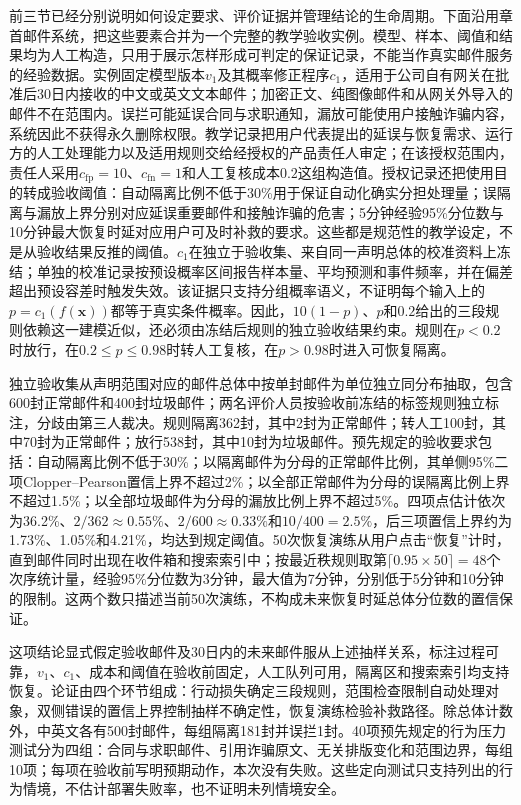 前三节已经分别说明如何设定要求、评价证据并管理结论的生命周期。下面沿用章首邮件系统，把这些要素合并为一个完整的教学验收实例。模型、样本、阈值和结果均为人工构造，只用于展示怎样形成可判定的保证记录，不能当作真实邮件服务的经验数据。实例固定模型版本$v_1$及其概率修正程序$c_1$，适用于公司自有网关在批准后30日内接收的中文或英文文本邮件；加密正文、纯图像邮件和从网关外导入的邮件不在范围内。误拦可能延误合同与求职通知，漏放可能使用户接触诈骗内容，系统因此不获得永久删除权限。教学记录把用户代表提出的延误与恢复需求、运行方的人工处理能力以及适用规则交给经授权的产品责任人审定；在该授权范围内，责任人采用$c_{\mathrm{fp}}=10$、$c_{\mathrm{fn}}=1$和人工复核成本$0.2$这组构造值。授权记录还把使用目的转成验收阈值：自动隔离比例不低于30\%用于保证自动化确实分担处理量；误隔离与漏放上界分别对应延误重要邮件和接触诈骗的危害；5分钟经验95\%分位数与10分钟最大恢复时延对应用户可及时补救的要求。这些都是规范性的教学设定，不是从验收结果反推的阈值。$c_1$在独立于验收集、来自同一声明总体的校准资料上冻结；单独的校准记录按预设概率区间报告样本量、平均预测和事件频率，并在偏差超出预设容差时触发失效。该证据只支持分组概率语义，不证明每个输入上的$p=c_1(f(\bm x))$都等于真实条件概率。因此，$10(1-p)$、$p$和$0.2$给出的三段规则依赖这一建模近似，还必须由冻结后规则的独立验收结果约束。规则在$p<0.2$时放行，在$0.2\leq p\leq0.98$时转人工复核，在$p>0.98$时进入可恢复隔离。

独立验收集从声明范围对应的邮件总体中按单封邮件为单位独立同分布抽取，包含600封正常邮件和400封垃圾邮件；两名评价人员按验收前冻结的标签规则独立标注，分歧由第三人裁决。规则隔离362封，其中2封为正常邮件；转人工100封，其中70封为正常邮件；放行538封，其中10封为垃圾邮件。预先规定的验收要求包括：自动隔离比例不低于30\%；以隔离邮件为分母的正常邮件比例，其单侧95\%二项Clopper--Pearson置信上界不超过2\%；以全部正常邮件为分母的误隔离比例上界不超过1.5\%；以全部垃圾邮件为分母的漏放比例上界不超过5\%。四项点估计依次为36.2\%、$2/362\approx0.55\%$、$2/600\approx0.33\%$和$10/400=2.5\%$，后三项置信上界约为1.73\%、1.05\%和4.21\%，均达到规定阈值。50次恢复演练从用户点击“恢复”计时，直到邮件同时出现在收件箱和搜索索引中；按最近秩规则取第$\lceil0.95\times50\rceil=48$个次序统计量，经验95\%分位数为3分钟，最大值为7分钟，分别低于5分钟和10分钟的限制。这两个数只描述当前50次演练，不构成未来恢复时延总体分位数的置信保证。

这项结论显式假定验收邮件及30日内的未来邮件服从上述抽样关系，标注过程可靠，$v_1$、$c_1$、成本和阈值在验收前固定，人工队列可用，隔离区和搜索索引均支持恢复。论证由四个环节组成：行动损失确定三段规则，范围检查限制自动处理对象，双侧错误的置信上界控制抽样不确定性，恢复演练检验补救路径。除总体计数外，中英文各有500封邮件，每组隔离181封并误拦1封。40项预先规定的行为压力测试分为四组：合同与求职邮件、引用诈骗原文、无关排版变化和范围边界，每组10项；每项在验收前写明预期动作，本次没有失败。这些定向测试只支持列出的行为情境，不估计部署失败率，也不证明未列情境安全。

